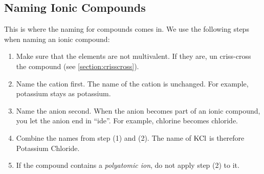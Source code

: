 \documentclass[12pt]{report}
\begin{document}
\subsection{Naming Ionic Compounds}
This is where the naming for compounds comes in. We use the following steps when naming an ionic compound: 
\begin{enumerate}
\setlength\itemsep{0.5em}
    \item{Make sure that the elements are not multivalent. If they are, un criss-cross the compound (see \ref{section:crisscross}).}
    \item{Name the cation first. The name of the cation is unchanged. For example, potassium stays as potassium.}
    \item{Name the anion second. When the anion becomes part of an ionic compound, you let the anion end in ``ide''. For example, chlorine becomes chloride.}
    \item{Combine the names from step (1) and (2). The name of $ \ce{KCl}$ is therefore Potassium Chloride.}
    \item{If the compound contains a \textit{polyatomic ion}, do not apply step (2) to it.}
\end{enumerate}
\end{document}
